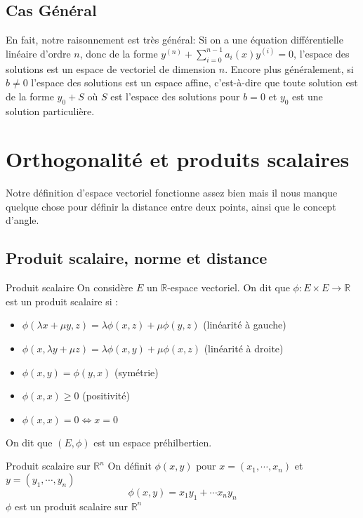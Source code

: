 \documentclass{classe}
\begin{document}
\subsection{Cas Général}
En fait, notre raisonnement est très général:
Si on a une équation différentielle linéaire d'ordre $n$, donc de la forme $y^{(n)} + \sum_{i = 0}^{n - 1} a_{i}(x)y^{(i)} = 0$, l'espace des solutions est un espace de vectoriel de dimension $n$.
Encore plus généralement, si $b \neq 0$ l'espace des solutions est un espace affine, c'est-à-dire que toute solution est de la forme $y_{0} + S$ où $S$ est l'espace des solutions pour $b = 0$ et $y_{0}$ est une solution particulière.

\section{Orthogonalité et produits scalaires}

Notre définition d'espace vectoriel fonctionne assez bien mais il nous manque quelque chose pour définir la distance entre deux points, ainsi que le concept d'angle.

\subsection{Produit scalaire, norme et distance}

\begin{définition}{Produit scalaire}{}
On considère $E$ un $\mathbb{R}$-espace vectoriel. On dit que $\phi : E\times E \rightarrow \mathbb{R}$ est un produit scalaire si :
\begin{itemize}
\item $\phi(\lambda x + \mu y, z) = \lambda\phi(x, z) + \mu\phi(y, z)$ (linéarité à gauche)
\item $\phi(x, \lambda y +\mu z) = \lambda\phi(x, y) + \mu\phi(x, z)$ (linéarité à droite)
\item $\phi(x, y) = \phi(y, x)$ (symétrie)
\item $\phi(x, x) \geq 0$ (positivité)
\item $\phi(x, x) = 0 \iff x = 0$
\end{itemize}
On dit que $(E, \phi)$ est un espace préhilbertien.
\end{définition}

\begin{propositionfr}{Produit scalaire sur $\mathbb{R}^n$}{}
On définit $\phi(x, y)$ pour $x=(x_1, \cdots, x_n)$ et $y= (y_1, \cdots, y_n)$
\begin{equation*}
\phi(x, y) = x_1y_1 + \cdots x_ny_n
\end{equation*}
$\phi$ est un produit scalaire sur $\mathbb{R}^n$
\end{propositionfr}
\end{document}
